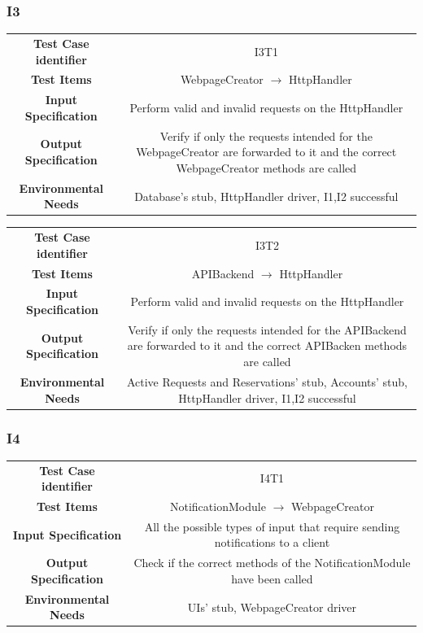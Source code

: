 \documentclass{article}
\begin{document}
\subsubsection{I3}
\begin{adjustbox}{width=1.2\textwidth}	
	\begin{tabular}{*{2}{c}}
		\toprule
		\textbf{Test Case identifier} & I3T1\\
		\textbf{Test Items} & WebpageCreator $\rightarrow$ HttpHandler\\
		\textbf{Input Specification} & Perform valid and invalid requests on the HttpHandler\\
		\textbf{Output Specification} & Verify if only the requests intended for
		the WebpageCreator are forwarded to it and the correct WebpageCreator methods are called\\
		\textbf{Environmental Needs} & Database's stub, HttpHandler driver, I1,I2 successful\\
		\bottomrule
	\end{tabular}
\end{adjustbox}
\begin{adjustbox}{width=1.2\textwidth}	
	\begin{tabular}{*{2}{c}}
		\toprule
		\textbf{Test Case identifier} & I3T2\\
		\textbf{Test Items} & APIBackend $\rightarrow$ HttpHandler\\
		\textbf{Input Specification} & Perform valid and invalid requests on the HttpHandler\\
		\textbf{Output Specification} & Verify if only the requests intended for
		the APIBackend are forwarded to it and the correct APIBacken methods are called\\
		\textbf{Environmental Needs} & Active Requests and Reservations' stub, Accounts' stub, HttpHandler driver, I1,I2 successful\\
		\bottomrule
	\end{tabular}
\end{adjustbox}
\subsubsection{I4}
\begin{adjustbox}{width=1.2\textwidth}	
	\begin{tabular}{*{2}{c}}
		\toprule
		\textbf{Test Case identifier} & I4T1\\
		\textbf{Test Items} & NotificationModule $\rightarrow$ WebpageCreator\\
		\textbf{Input Specification} & All the possible types of input that require sending notifications to a client \\ 
		\textbf{Output Specification} & Check if the correct methods of the NotificationModule have been called\\
		\textbf{Environmental Needs} & UIs' stub, WebpageCreator driver\\
		\bottomrule
	\end{tabular}
\end{adjustbox}
\end{document}
